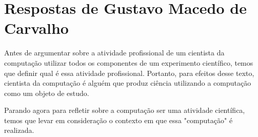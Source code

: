 \section{Respostas de Gustavo Macedo de Carvalho}

Antes de argumentar sobre a atividade profissional de um cientista da computação utilizar todos os componentes de um experimento científico, temos que definir qual é essa atividade profissional. Portanto, para efeitos desse texto, cientista da computação é alguém que produz ciência utilizando a computação como um objeto de estudo.

Parando agora para refletir sobre a computação ser uma atividade científica, temos que levar em consideração o contexto em que essa "computação" é realizada.